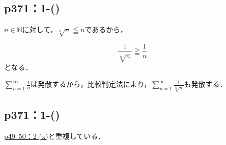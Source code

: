 \subsection*{p371：1-()}

\begin{tanswer}
    $n \in \mathbb{N}$に対して，$ \sqrt[n]{n} \leqq n$であるから，

    \[
        \frac{1}{\sqrt[n]{n}} \geqq \frac{1}{n}
    \]
    となる．

    $ \sum_{n=1}^{\infty} \frac{1}{n}$は発散するから，比較判定法により，$ \sum_{n=1}^{\infty} \frac{1}{\sqrt[n]{n}}$も発散する．
\end{tanswer}


\subsection*{p371：1-()}

\hyperref[p49--50：2-(x)]{p49--50：2-(x)}と重複している．
